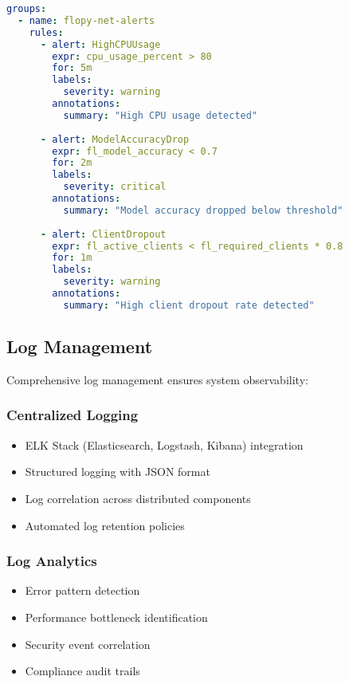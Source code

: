 \begin{lstlisting}[language=yaml, caption=Alert Rules Configuration]
groups:
  - name: flopy-net-alerts
    rules:
      - alert: HighCPUUsage
        expr: cpu_usage_percent > 80
        for: 5m
        labels:
          severity: warning
        annotations:
          summary: "High CPU usage detected"
          
      - alert: ModelAccuracyDrop
        expr: fl_model_accuracy < 0.7
        for: 2m
        labels:
          severity: critical
        annotations:
          summary: "Model accuracy dropped below threshold"
          
      - alert: ClientDropout
        expr: fl_active_clients < fl_required_clients * 0.8
        for: 1m
        labels:
          severity: warning
        annotations:
          summary: "High client dropout rate detected"
\end{lstlisting}

\subsection{Log Management}

Comprehensive log management ensures system observability:

\subsubsection{Centralized Logging}
\begin{itemize}
    \item ELK Stack (Elasticsearch, Logstash, Kibana) integration
    \item Structured logging with JSON format
    \item Log correlation across distributed components
    \item Automated log retention policies
\end{itemize}

\subsubsection{Log Analytics}
\begin{itemize}
    \item Error pattern detection
    \item Performance bottleneck identification
    \item Security event correlation
    \item Compliance audit trails
\end{itemize}

